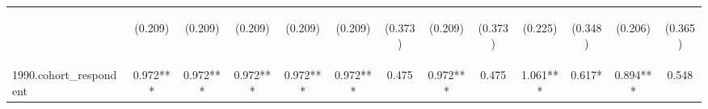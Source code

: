 \begin{center}
\begin{tabular}{lcccccccccccc}
\vspace{4pt} & \begin{footnotesize}(0.209)\end{footnotesize} & \begin{footnotesize}(0.209)\end{footnotesize} & \begin{footnotesize}(0.209)\end{footnotesize} & \begin{footnotesize}(0.209)\end{footnotesize} & \begin{footnotesize}(0.209)\end{footnotesize} & \begin{footnotesize}(0.373)\end{footnotesize} & \begin{footnotesize}(0.209)\end{footnotesize} & \begin{footnotesize}(0.373)\end{footnotesize} & \begin{footnotesize}(0.225)\end{footnotesize} & \begin{footnotesize}(0.348)\end{footnotesize} & \begin{footnotesize}(0.206)\end{footnotesize} & \begin{footnotesize}(0.365)\end{footnotesize} \\
1990.cohort\_respondent & 0.972*** & 0.972*** & 0.972*** & 0.972*** & 0.972*** & 0.475 & 0.972*** & 0.475 & 1.061*** & 0.617* & 0.894*** & 0.548 \\

\end{tabular}
\end{center}
